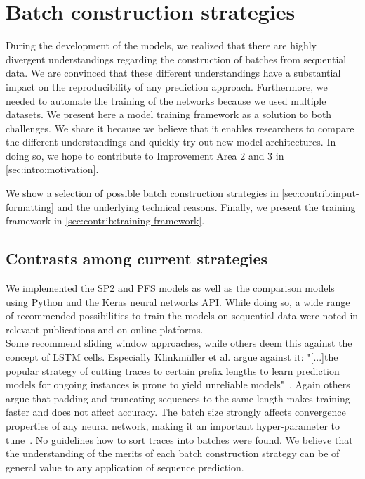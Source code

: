 \chapter{Batch construction strategies}\label{chap:training-framework}
During the development of the models, we realized that there are highly divergent understandings regarding the construction of batches from sequential data.
We are convinced that these different understandings have a substantial impact on the reproducibility of any prediction approach.
Furthermore, we needed to automate the training of the networks because we used multiple datasets.
We present here a model training framework as a solution to both challenges.
We share it because we believe that it enables researchers to compare the different understandings and quickly try out new model architectures.
In doing so, we hope to contribute to Improvement Area 2 and 3 in \autoref{sec:intro:motivation}.

We show a selection of possible batch construction strategies in \autoref{sec:contrib:input-formatting} and the underlying technical reasons. Finally, we present the training framework in \autoref{sec:contrib:training-framework}.

\section{Contrasts among current strategies}\label{sec:contrib:input-formatting}
We implemented the SP2 and PFS models as well as the comparison models using Python and the Keras neural networks API.
While doing so, a wide range of recommended possibilities to train the models on sequential data were noted in relevant publications and on online platforms.\\

Some recommend sliding window approaches, while others deem this against the concept of LSTM cells.
Especially Klinkmüller et al. argue against it: "[...]the popular strategy of cutting traces to certain prefix lengths to learn prediction models for ongoing instances is prone to yield unreliable models"~\cite{klinkmuller2018reliablemonitoring}.
Again others argue that padding and truncating sequences to the same length makes training faster and does not affect accuracy.
The batch size strongly affects convergence properties of any neural network, making it an important hyper-parameter to tune~\cite{keskar2016large}.
No guidelines how to sort traces into batches were found.
We believe that the understanding of the merits of each batch construction strategy can be of general value to any application of sequence prediction.\\

